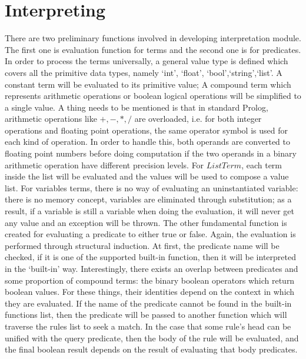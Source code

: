 \documentclass[11pt,a4paper]{report}
\begin{document}
\section*{Interpreting}
There are two preliminary functions involved in developing interpretation module. The first one is evaluation function for terms and the second one is for predicates.\\

In order to process the terms universally, a general value type is defined which covers all the primitive data types, namely `int', `float', `bool',`string',`list'. A constant term will be evaluated to its primitive value; A compound term which represents arithmetic operations or boolean logical operations will be simplified to a single value. A thing needs to be mentioned is that in standard Prolog, arithmetic operations like $+,-,*,/$ are overloaded, i.e. for both integer operations and floating point operations, the same operator symbol is used for each kind of operation. In order to handle this, both operands are converted to floating point numbers before doing computation if the two operands in a binary arithmetic operation have different precision levels. For $ListTerm$, each term inside the list will be evaluated and the values will be used to compose a value list. For variables terms, there is no way of evaluating an uninstantiated variable: there is no memory concept, variables are eliminated through substitution; as a result, if a variable is still a variable when doing the evaluation, it will never get any value and an exception will be thrown.
\bigskip
The other fundamental function is created for evaluating a predicate to either true or false. Again, the evaluation is performed through structural induction. At first, the predicate name will be checked, if it is one of the supported built-in function, then it will be interpreted in the `built-in' way. Interestingly, there exists an overlap between predicates and some proportion of compound terms: the binary boolean operators which return boolean values. For these things, their identities depend on the context in which they are evaluated. If the name of the predicate cannot be found in the built-in functions list, then the predicate will be passed to another function which will traverse the rules list to seek a match. In the case that some rule's head can be unified with the query predicate, then the body of the rule will be evaluated, and the final boolean result depends on the result of evaluating that body predicates. 

\bigskip
\end{document}
